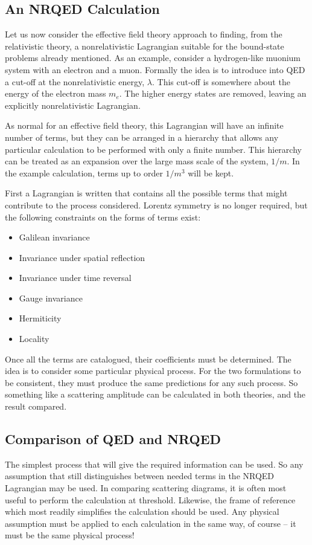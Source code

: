 \subsection{An NRQED Calculation}

Let us now consider the effective field theory approach to finding, from the relativistic theory, a nonrelativistic Lagrangian suitable for the bound-state problems already mentioned.  As an example, consider a hydrogen-like muonium system with an electron and a muon.  Formally the idea is to introduce into QED a cut-off at the nonrelativistic energy, $\lambda$.  This cut-off is somewhere about the energy of the electron mass $m_e$.    The higher energy states are removed, leaving an explicitly nonrelativistic Lagrangian.

As normal for an effective field theory, this Lagrangian will have an infinite number of terms, but they can be arranged in a hierarchy that allows any particular calculation to be performed with only a finite number.  This hierarchy can be treated as an expansion over the large mass scale of the system, $1/m$.  In the example calculation, terms up to order $1/m^3$ will be kept.

First a Lagrangian is written that contains all the possible terms that might contribute to the process considered.  Lorentz symmetry is no longer required, but the following constraints on the forms of terms exist:
\begin{itemize}
  \item Galilean invariance
  \item Invariance under spatial reflection
  \item Invariance under time reversal
  \item Gauge invariance
  \item Hermiticity
  \item Locality
\end{itemize}

Once all the terms are catalogued, their coefficients must be determined.  The idea is to consider some particular physical process.  For the two formulations to be consistent, they must produce the same predictions for any such process.  So something like a scattering amplitude can be calculated in both theories, and the result compared.

\subsection{Comparison of QED and NRQED}
The simplest process that will give the required information can be used.  So any assumption that still distinguishes between needed terms in the NRQED Lagrangian may be used.  In comparing scattering diagrams, it is often most useful to perform the calculation at threshold.  Likewise, the  frame of reference which most readily simplifies the calculation should be used.  Any physical assumption must be applied to each calculation in the same way, of course -- it must be the same physical process!

